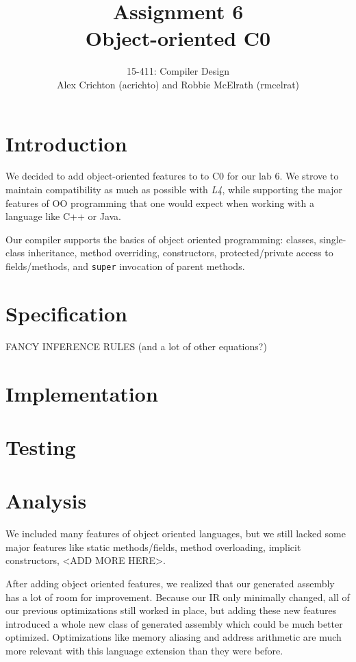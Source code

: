 \documentclass{article}
\title{Assignment 6\\ Object-oriented C0}
\author{15-411: Compiler Design\\
Alex Crichton (acrichto) and Robbie McElrath (rmcelrat)}
\begin{document}
\maketitle
\doublespacing

\section{Introduction}

We decided to add object-oriented features to to C0 for our lab 6. We strove to
maintain compatibility as much as possible with \emph{L4}, while supporting the
major features of OO programming that one would expect when working with a
language like C++ or Java.

Our compiler supports the basics of object oriented programming: classes,
single-class inheritance, method overriding, constructors, protected/private
access to fields/methods, and \texttt{super} invocation of parent methods.

\section{Specification}

FANCY INFERENCE RULES (and a lot of other equations?)

\section{Implementation}

\section{Testing}

\section{Analysis}

We included many features of object oriented languages, but we still lacked some
major features like static methods/fields, method overloading, implicit
constructors, <ADD MORE HERE>.

After adding object oriented features, we realized that our generated assembly
has a lot of room for improvement. Because our IR only minimally changed, all of
our previous optimizations still worked in place, but adding these new features
introduced a whole new class of generated assembly which could be much better
optimized. Optimizations like memory aliasing and address arithmetic are much
more relevant with this language extension than they were before.
\end{document}
